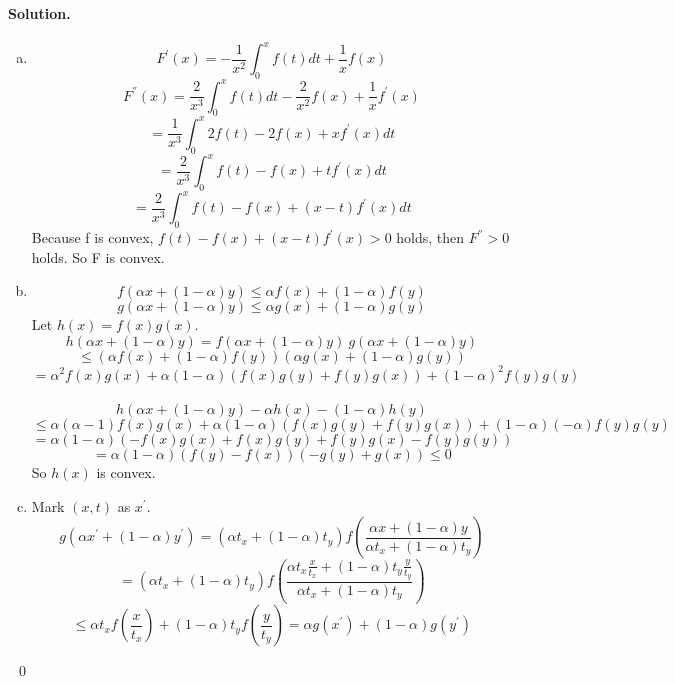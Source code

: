\documentclass[a4paper]{article}
\newenvironment{solution}
{\color{blue} \paragraph{Solution.}}
{\newline \qed}
\begin{document}
\begin{solution}

\begin{enumerate}[a)]
    \item   $$F^{'} (x) = -\frac{1}{x^2} \int_{0}^x f(t) dt + \frac{1}{x} f(x)$$
            $$F^{''} (x) = \frac{2}{x^3}\int_{0}^x f(t) dt - \frac{2}{x^2} f(x) + \frac{1}{x} f^{'} (x)$$
            $$= \frac{1}{x^3} \int _{0} ^x 2f(t) - 2 f(x) + x f^{'}(x) dt$$
            $$= \frac{2}{x^3} \int _{0} ^{x} f(t) - f(x) + tf^{'} (x) dt$$
            $$= \frac{2}{x^3} \int _{0} ^{x} f(t) - f(x) + (x - t) f^{'} (x) dt$$
            Because f is convex, $f(t) - f(x) + (x - t) f^{'} (x) > 0$ holds, then $F^{''} > 0$ holds. So F is convex.

    \item   

            $$f(\alpha x + (1 - \alpha) y ) \leq \alpha f(x) + (1 - \alpha) f(y)$$
            $$g(\alpha x + (1 - \alpha) y ) \leq \alpha g(x) + (1 - \alpha) g(y)$$
            Let $h(x) = f(x)g(x)$.
            $$h(\alpha x + (1 - \alpha) y ) = f(\alpha x + (1 - \alpha) y )\ g(\alpha x + (1 - \alpha) y )$$
            $$\leq (\alpha f(x) + (1 - \alpha) f(y))(\alpha g(x) + (1 - \alpha) g(y))$$
            $$= \alpha^2 f(x)g(x) + \alpha (1 - \alpha)(f(x)g(y) + f(y)g(x)) + (1-\alpha)^2 f(y)g(y)$$\
            \\
            $$h(\alpha x + (1 - \alpha) y ) - \alpha h(x) - (1 - \alpha)h(y)$$
            $$\leq \alpha (\alpha - 1) f(x)g(x) + \alpha (1 - \alpha)(f(x)g(y) + f(y)g(x)) + (1-\alpha)( - \alpha) f(y)g(y)$$
            $$= \alpha (1 - \alpha)(-f(x)g(x) + f(x)g(y) + f(y)g(x) - f(y)g(y))$$
            $$= \alpha (1 - \alpha)(f(y) - f(x))( - g(y) + g(x)) \leq 0$$
            So $h(x)$ is convex.

    \item  Mark $(x,t)$ as $x^{'}$.
            $$g(\alpha x^{'} + (1 - \alpha) y^{'}) = (\alpha t_x + (1 - \alpha) t_y) f(\frac{\alpha x + (1 - \alpha) y}{\alpha t_x + (1 - \alpha) t_y})$$
            $$= (\alpha t_x + (1 - \alpha) t_y) f(\frac{\alpha t_x \frac{x}{t_x} + (1 - \alpha) t_y \frac{y}{t_y}}{\alpha t_x + (1 - \alpha) t_y})$$
            $$\leq \alpha t_x f(\frac{x}{t_x}) + (1 - \alpha) t_y f(\frac{y}{t_y}) = \alpha g(x^{'}) + (1 - \alpha) g(y^{'})$$
            
\end{enumerate}
\
\end{solution}
\end{document}
